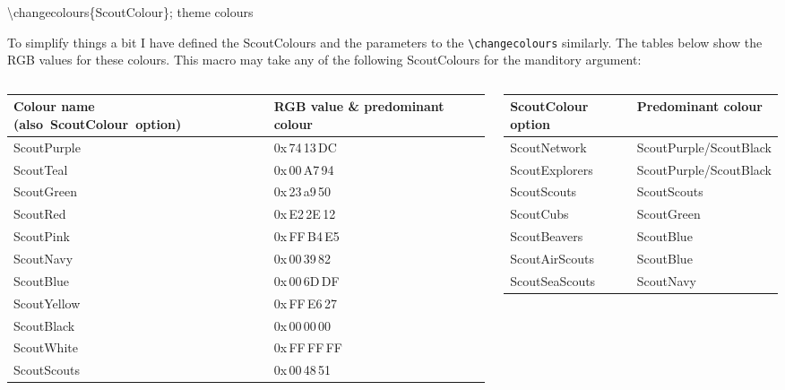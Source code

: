 {
\begin{frame}{\textbackslash{}changecolours\{ScoutColour\}; theme colours}
\parbox{\columnwidth}{\scriptsize To simplify things a bit I have defined the \alert{ScoutColours} and the parameters to the {\tt \textbackslash{}changecolours} similarly. The tables below show the RGB values for these colours. This macro may take any of the following ScoutColours for the manditory argument:}

\vspace{0.5\baselineskip}
\begin{columns}[onlytextwidth,T]
\begin{column}{0.48\textwidth}
\Tiny
\begin{tabularx}{\columnwidth}{XX}
\toprule
\raggedright Colour name \mbox{(also ScoutColour option)}&RGB value \& predominant colour\\
\midrule
ScoutPurple&0x\,74\,13\,DC\\
ScoutTeal&0x\,00\,A7\,94\\
ScoutGreen&0x\,23\,a9\,50\\
ScoutRed&0x\,E2\,2E\,12\\
ScoutPink&0x\,FF\,B4\,E5\\
ScoutNavy&0x\,00\,39\,82\\
ScoutBlue&0x\,00\,6D\,DF\\
ScoutYellow&0x\,FF\,E6\,27\\
ScoutBlack&0x\,00\,00\,00\\
ScoutWhite&0x\,FF\,FF\,FF\\
ScoutScouts\footnotemark[2]&0x\,00\,48\,51\\
\bottomrule
\end{tabularx}
\end{column}
\begin{column}{0.48\textwidth}
\Tiny
\begin{tabularx}{\columnwidth}{XX}
\toprule
ScoutColour option&Predominant colour\\
\midrule
ScoutNetwork&ScoutPurple/ScoutBlack\\
ScoutExplorers&ScoutPurple/ScoutBlack\\
ScoutScouts&ScoutScouts\\
ScoutCubs&ScoutGreen\\
ScoutBeavers&ScoutBlue\\
ScoutAirScouts&ScoutBlue\\
ScoutSeaScouts&ScoutNavy\\
\bottomrule
\end{tabularx}
\end{column}
\end{columns}
\end{frame}
}

